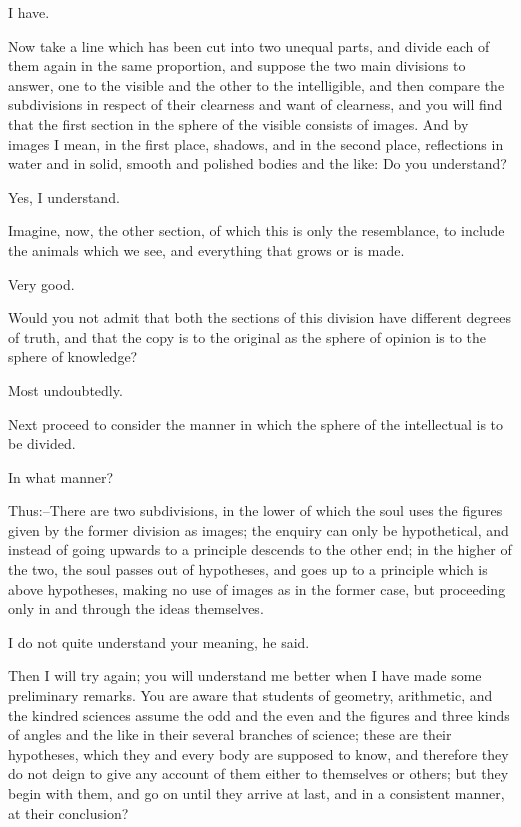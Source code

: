 I have.

Now take a line which has been cut into two unequal parts, and divide
each of them again in the same proportion, and suppose the two
main divisions to answer, one to the visible and the other to the
intelligible, and then compare the subdivisions in respect of their
clearness and want of clearness, and you will find that the first
section in the sphere of the visible consists of images. And by images I
mean, in the first place, shadows, and in the second place, reflections
in water and in solid, smooth and polished bodies and the like: Do you
understand?

Yes, I understand.

Imagine, now, the other section, of which this is only the resemblance,
to include the animals which we see, and everything that grows or is
made.

Very good.

Would you not admit that both the sections of this division have
different degrees of truth, and that the copy is to the original as the
sphere of opinion is to the sphere of knowledge?

Most undoubtedly.

Next proceed to consider the manner in which the sphere of the
intellectual is to be divided.

In what manner?

Thus:--There are two subdivisions, in the lower of which the soul uses
the figures given by the former division as images; the enquiry can only
be hypothetical, and instead of going upwards to a principle descends
to the other end; in the higher of the two, the soul passes out of
hypotheses, and goes up to a principle which is above hypotheses, making
no use of images as in the former case, but proceeding only in and
through the ideas themselves.

I do not quite understand your meaning, he said.

Then I will try again; you will understand me better when I have made
some preliminary remarks. You are aware that students of geometry,
arithmetic, and the kindred sciences assume the odd and the even and the
figures and three kinds of angles and the like in their several branches
of science; these are their hypotheses, which they and every body are
supposed to know, and therefore they do not deign to give any account of
them either to themselves or others; but they begin with them, and go
on until they arrive at last, and in a consistent manner, at their
conclusion?

